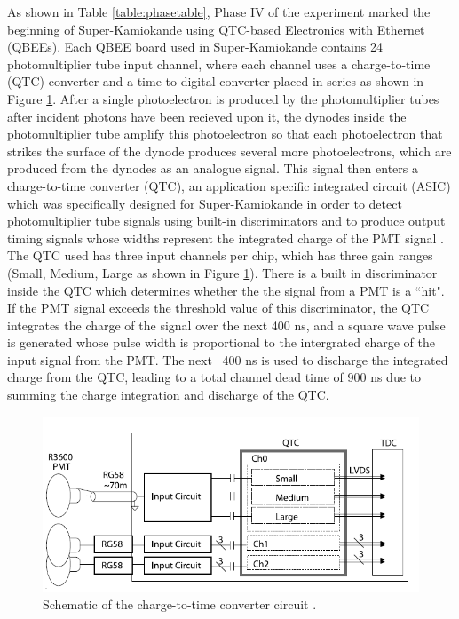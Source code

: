 As shown in Table \ref{table:phasetable}, Phase IV of the experiment marked the beginning of Super-Kamiokande using QTC-based Electronics with Ethernet (QBEEs). Each QBEE board used in Super-Kamiokande contains 24 photomultiplier tube input channel, where each channel uses a charge-to-time (QTC) converter and a time-to-digital converter placed in series as shown in Figure \ref{fig:superkdaq}. After a single photoelectron is produced by the photomultiplier tubes after incident photons have been recieved upon it, the dynodes inside the photomultiplier tube amplify this photoelectron so that each photoelectron that strikes the surface of the dynode produces several more photoelectrons, which are produced from the dynodes as an analogue signal. This signal then enters a charge-to-time converter (QTC), an application specific integrated circuit (ASIC) which was specifically designed for Super-Kamiokande in order to detect photomultiplier tube signals using built-in discriminators and to produce output timing signals whose widths represent the integrated charge of the PMT signal \cite{xu2016current}. The QTC used has three input channels per chip, which has three gain ranges (Small, Medium, Large as shown in Figure \ref{fig:superkdaq}). There is a built in discriminator inside the QTC which determines whether the the signal from a PMT is a ``hit". If the PMT signal exceeds the threshold value of this discriminator, the QTC integrates the charge of the signal over the next 400 ns, and a square wave pulse is generated whose pulse width is proportional to the intergrated charge of the input signal from the PMT. The next ~400 ns is used to discharge the integrated charge from the QTC, leading to a total channel dead time of 900 ns due to summing the charge integration and discharge of the QTC. 
\newline

\begin{figure}
    \includegraphics[width=\textwidth]{Figures/superk_daq.png}
\caption{Schematic of the charge-to-time converter circuit \cite{nishino_high-speed_2009}.}
    \label{fig:superkdaq}
\end{figure}

